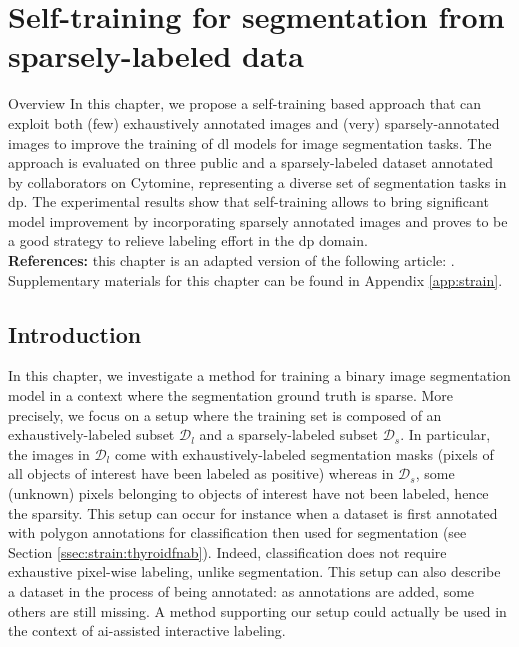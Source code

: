 \chapter{Self-training for segmentation from sparsely-labeled data}
\label{chap:strain}

\begin{overview}{Overview}
  In this chapter, we propose a self-training based approach that can exploit both (few) exhaustively annotated images and (very) sparsely-annotated images to improve the training of \acrlong{dl} models for image segmentation tasks. The approach is evaluated on three public and a sparsely-labeled dataset annotated by collaborators on Cytomine, representing a diverse set of segmentation tasks in \acrlong{dp}. The experimental results show that self-training allows to bring significant model improvement by incorporating sparsely annotated images and proves to be a good strategy to relieve labeling effort in the \acrlong{dp} domain.\\
  
  \textbf{References:} this chapter is an adapted version of the following article:  . \\
  
  Supplementary materials for this chapter can be found in Appendix \ref{app:strain}.
  \end{overview}

\section{Introduction}
\label{sec:strain:intro}

In this chapter, we investigate a method for training a binary image segmentation model in a context where the segmentation ground truth is sparse. More precisely, we focus on a setup where the training set is composed of an exhaustively-labeled subset $\mathcal{D}_l$ and a sparsely-labeled subset $\mathcal{D}_s$. In particular, the images in $\mathcal{D}_l$ come with exhaustively-labeled segmentation masks (\ie pixels of all objects of interest have been labeled as positive) whereas in $\mathcal{D}_s$, some (unknown) pixels belonging to objects of interest have not been labeled, hence the sparsity. This setup can occur for instance when a dataset is first annotated with polygon annotations for classification then used for segmentation (see Section \ref{ssec:strain:thyroidfnab}). Indeed, classification does not require exhaustive pixel-wise labeling, unlike segmentation. This setup can also describe a dataset in the process of being annotated: as annotations are added, some others are still missing. A method supporting our setup could actually be used in the context of \acrshort{ai}-assisted interactive labeling.

